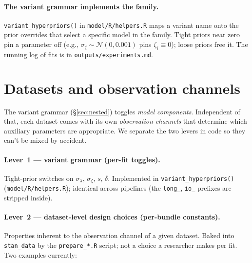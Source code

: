 \documentclass[11pt]{article}
\newcommand{\Norm}{\mathcal{N}}
\begin{document}
\paragraph{The variant grammar implements the family.}
\texttt{variant\_hyperpriors()} in \texttt{model/R/helpers.R} maps a
variant name onto the prior overrides that select a specific model in
the family. Tight priors near zero pin a parameter off (e.g.,
\(\sigma_\zeta \sim \Norm(0, 0.001)\) pins \(\zeta_i \equiv 0\)); loose
priors free it. The running log of fits is in
\texttt{outputs/experiments.md}.

\section{Datasets and observation channels}
\label{sec:channels}

The variant grammar (§\ref{sec:nested}) toggles \emph{model
components}. Independent of that, each dataset comes with its own
\emph{observation channels} that determine which auxiliary parameters
are appropriate. We separate the two levers in code so they can't be
mixed by accident.

\paragraph{Lever~1 — variant grammar (per-fit toggles).}
Tight-prior switches on \(\sigma_\lambda\), \(\sigma_\zeta\),
\(s\), \(\delta\). Implemented in
\texttt{variant\_hyperpriors()} (\texttt{model/R/helpers.R}); identical
across pipelines (the \texttt{long\_}, \texttt{io\_} prefixes are
stripped inside).

\paragraph{Lever~2 — dataset-level design choices (per-bundle constants).}
Properties inherent to the observation channel of a given dataset.
Baked into \texttt{stan\_data} by the \texttt{prepare\_*.R} script;
not a choice a researcher makes per fit. Two examples currently:
\end{document}

